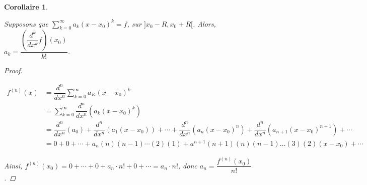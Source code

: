 \documentclass{report}
\newcommand*{\dsum}[4]{\displaystyle\sum_{#1=#2}^{#3}#4}
\newtheorem*{coro}{Corollaire}
\theoremstyle{definition}
\theoremstyle{remark}
\begin{document}
	\begin{coro}~

		Supposons que $\dsum{k}{0}{\infty}{a_k(x-x_0)^k} = f$, sur $]x_0-R, x_0+R[$. Alors, $a_k = \dfrac{\left(\dfrac{d^k}{dx^k}f\right)(x_0)}{k!}$.
		\begin{proof}~

			\begin{align*}
				f^{(n)}(x)&= \dfrac{d^n}{dx^n}\dsum{k}{0}{\infty}{a_K(x-x_0)^k}\\
				&= \dsum{k}{0}{\infty}{\dfrac{d^n}{dx^n}(a_k(x-x_0)^k)}\\
				&= \dfrac{d^n}{dx^n}(a_0) + \dfrac{d^n}{dx^n}(a_1(x-x_0)) + \dotsb + \dfrac{d^n}{dx^n}(a_n(x-x_0)^n) + \dfrac{d^n}{dx^n}(a_{n+1}(x-x_0)^{n+1}) + \dotsb\\
				&= 0 + 0 + \dotsb + a_n(n)(n-1)\dotsb(2)(1) + a^{n+1}(n+1)(n)(n-1)\dots(3)(2)(x-x_0) + \dotsb
			\end{align*}

			Ainsi, $f^{(n)}(x_0) = 0 + \dotsb + 0 + a_n \cdot n! + 0 + \dotsb = a_n \cdot n!$, donc $a_n = \dfrac{f^{(n)}(x_0)}{n!}$.
		\end{proof}
	\end{coro}
\end{document}
